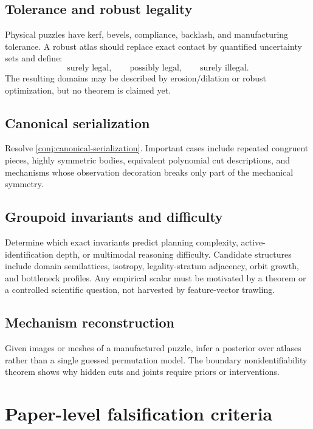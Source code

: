 \documentclass[11pt,openany]{book}
\theoremstyle{polyplain}
\theoremstyle{polydef}
\begin{document}
\subsection{Tolerance and robust legality}
Physical puzzles have kerf, bevels, compliance, backlash, and manufacturing tolerance. A robust atlas should replace exact contact by quantified uncertainty sets and define:
\[
\text{surely legal},\qquad
\text{possibly legal},\qquad
\text{surely illegal}.
\]
The resulting domains may be described by erosion/dilation or robust optimization, but no theorem is claimed yet.

\subsection{Canonical serialization}
Resolve \cref{conj:canonical-serialization}. Important cases include repeated congruent pieces, highly symmetric bodies, equivalent polynomial cut descriptions, and mechanisms whose observation decoration breaks only part of the mechanical symmetry.

\subsection{Groupoid invariants and difficulty}
Determine which exact invariants predict planning complexity, active-identification depth, or multimodal reasoning difficulty. Candidate structures include domain semilattices, isotropy, legality-stratum adjacency, orbit growth, and bottleneck profiles. Any empirical scalar must be motivated by a theorem or a controlled scientific question, not harvested by feature-vector trawling.

\subsection{Mechanism reconstruction}
Given images or meshes of a manufactured puzzle, infer a posterior over atlases rather than a single guessed permutation model. The boundary nonidentifiability theorem shows why hidden cuts and joints require priors or interventions.

\section{Paper-level falsification criteria}
\end{document}
